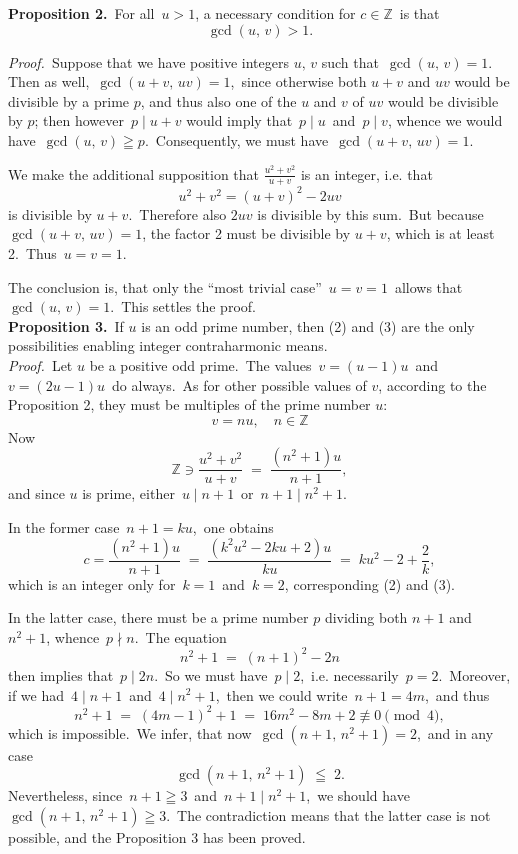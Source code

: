 \documentclass[12pt]{article}
\theoremstyle{definition}
\begin{document}
\textbf{Proposition 2.}\, For all\, $u > 1$, a necessary condition for $c \in \mathbb{Z}$\, is that
                       $$\gcd(u,\,v) > 1.$$

\emph{Proof.}\, Suppose that we have positive integers $u,\,v$ such that\, $\gcd(u,\,v) = 1$.\, Then as well,\, $\gcd(u\!+\!v,\,uv) = 1$,\, since otherwise both $u\!+\!v$ and $uv$ would be divisible by a prime $p$, and thus also one of the  $u$ and $v$ of $uv$ would be divisible by $p$; then however\, $p \mid u\!+\!v$ would imply that\, $p \mid u$\, and\, $p \mid v$, whence we would have\, $\gcd(u,\,v) \geqq p$.\, Consequently, we must have\, $\gcd(u\!+\!v,\,uv) = 1$.

We make the additional supposition that $\displaystyle\frac{u^2\!+\!v^2}{u\!+\!v}$ is an integer, i.e. that
                   $$u^2\!+\!v^2 = (u\!+\!v)^2\!-\!2uv$$
is divisible by $u\!+\!v$.\, Therefore also $2uv$ is divisible by this sum.\, But because\, $\gcd(u\!+\!v,\,uv) = 1$, the factor 2 must be divisible by $u\!+\!v$, which is at least 2.\, Thus\, $u = v = 1$.

The conclusion is, that only the ``most trivial case''\, $u = v = 1$\, allows that\, $\gcd(u,\,v) = 1$.\, This settles the proof.\\


\textbf{Proposition 3.}\, If $u$ is an odd prime number, then (2) and (3) are the only possibilities enabling integer contraharmonic means.\\

\emph{Proof.}\, Let $u$ be a positive odd prime.\, The values\, $v = (u\!-\!1)u$\, and\, $v = (2u\!-\!1)u$\, do always.\, As for other possible values of $v$, according to the Proposition 2, they must be multiples of the prime number $u$:
$$v = nu, \quad n \in \mathbb{Z}$$
Now
$$\mathbb{Z} \ni \frac{u^2\!+\!v^2}{u\!+\!v} \;=\; \frac{(n^2\!+\!1)u}{n\!+\!1},$$
and since $u$ is prime, either\, $u \mid n\!+\!1$\, or\, $n\!+\!1 \mid n^2\!+\!1$.

In the former case\, $n+1 = ku$,\, one obtains
$$c = \frac{(n^2\!+\!1)u}{n\!+\!1} \;=\; \frac{(k^2u^2\!-\!2ku\!+\!2)u}{ku} \;=\; ku^2\!-\!2\!+\!\frac{2}{k},$$
which is an integer only for\, $k = 1$\, and\, $k = 2$, corresponding (2) and (3).

In the latter case, there must be a prime number $p$ dividing both $n\!+\!1$ and $n^2\!+\!1$, whence\, $p \nmid n$.\, The equation
$$n^2\!+\!1 \;=\; (n\!+\!1)^2\!-\!2n$$
then implies that\, $p \mid 2n$.\, So we must have\, $p \mid 2$,\, i.e. necessarily\, $p = 2$.\, Moreover, if we had\, 
$4 \mid n\!+\!1$\, and\, $4 \mid n^2\!+\!1$,\, then we could write\, $n\!+\!1 = 4m$,\, and thus 
$$n^2\!+\!1 \;=\; (4m\!-\!1)^2\!+\!1 \;=\; 16m^2\!-\!8m\!+\!2 \not\equiv 0 \pmod{4},$$
which is impossible.\, We infer, that now\, $\gcd(n\!+\!1,\,n^2\!+\!1) = 2$,\, and in any case
$$\gcd(n\!+\!1,\,n^2\!+\!1) \;\leqq\; 2.$$
Nevertheless, since\, $n\!+\!1 \geqq 3$\, and\, $n\!+\!1 \mid n^2\!+\!1$,\, we should have\, 
$\gcd(n\!+\!1,\,n^2\!+\!1) \geqq 3$.\, The contradiction means that the latter case is not possible, and the Proposition 3 has been proved.\\
\end{document}
